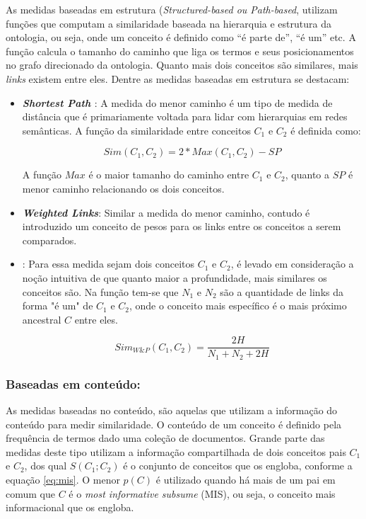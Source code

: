 As medidas baseadas em estrutura (\textit{Structured-based ou Path-based}, utilizam funções que computam a similaridade baseada na hierarquia e estrutura da ontologia, ou seja, onde um conceito é definido como “é parte de”, “é um” etc. A função calcula o tamanho do caminho que liga os termos e seus posicionamentos no grafo direcionado da ontologia. Quanto mais dois conceitos são similares, mais \textit{links} existem entre eles. Dentre as medidas baseadas em estrutura se destacam:

\begin{itemize}
	\item{\textbf{\textit{Shortest Path} \citep{Rada:1989}}: A medida do menor caminho é um tipo de medida de distância que é primariamente voltada para lidar com hierarquias em redes semânticas. A função da similaridade entre conceitos $C_1$ e $C_2$ é definida como:

	\begin{equation}
		Sim(C_1, C_2) = 2 * Max(C_1, C_2) - SP	
	\label{eq:shortest_path}
	\end{equation}
	
	A função $Max$ é o maior tamanho do caminho entre $C_1$ e $C_2$, quanto a $SP$ é menor caminho relacionando os dois conceitos.}
	
	\item{\textbf{\textit{Weighted Links}}: Similar a medida do menor caminho, contudo é introduzido um conceito de pesos para os links entre os conceitos a serem comparados.}
	
	\item{\textbf{\cite{Wu:1994}}: Para essa medida sejam dois conceitos $C_1$ e $C_2$, é levado em consideração a noção intuitiva de que quanto maior a profundidade, mais similares os conceitos são. Na função tem-se que $N_1$ e $N_2$ são a quantidade de links da forma "é um" de $C_1$ e $C_2$, onde o conceito mais específico é o mais próximo ancestral  $C$ entre eles. 

	\begin{equation}
		Sim_{W \& P}(C_1, C_2) = \frac{2H}{N_1 + N_2 + 2H}	
	\label{eq:wu_palmer}
	\end{equation}	}	
\end{itemize}

\subsubsection{Baseadas em conteúdo:}

As medidas baseadas no conteúdo, são aquelas que utilizam a informação do conteúdo para medir similaridade. O conteúdo de um conceito é definido pela frequência de termos dado uma coleção de documentos. Grande parte das medidas deste tipo utilizam a informação compartilhada de dois conceitos pais $C_1$ e $C_2$, dos qual $S(C_1; C_2)$ é o conjunto de conceitos que os engloba, conforme a equação \ref{eq:mis}.  O menor $p(C)$ é utilizado quando há mais de um pai em comum que $C$ é o \textit{most informative subsume} (MIS), ou seja, o conceito mais informacional que os engloba.

